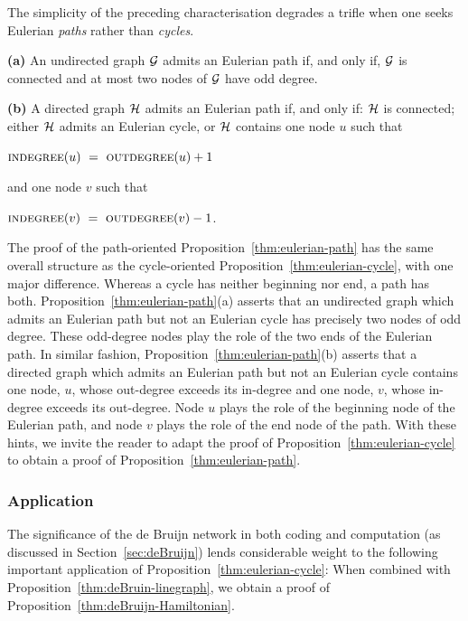 The simplicity of the preceding characterisation degrades a trifle when
one seeks Eulerian {\em paths} rather than {\em cycles}.

\begin{prop}
\label{thm:eulerian-path}
{\bf (a)}
An undirected graph $\mbox{$\cal G$}$ admits an Eulerian path if, and only if,
$\mbox{$\cal G$}$ is connected and at most two nodes of $\mbox{$\cal G$}$ have odd degree.

{\bf (b)}
A directed graph $\mbox{$\cal H$}$ admits an Eulerian path if, and only if: $\mbox{$\cal H$}$ is
connected; either $\mbox{$\cal H$}$ admits an Eulerian cycle, or $\mbox{$\cal H$}$ contains one
node $u$ such that

\hspace*{.5in}$\mbox{\sc indegree}(u) \ = \ \mbox{\sc outdegree}(u) +1$

\noindent
and one node $v$ such that

\hspace*{.5in}$\mbox{\sc indegree}(v) \ = \ \mbox{\sc outdegree}(v) -1$.
\end{prop}

The proof of the path-oriented Proposition~\ref{thm:eulerian-path} has
the same overall structure as the cycle-oriented
Proposition~\ref{thm:eulerian-cycle}, with one major difference.
Whereas a cycle has neither beginning nor end, a path has both.
Proposition~\ref{thm:eulerian-path}(a) asserts that an undirected
graph which admits an Eulerian path but not an Eulerian cycle has
precisely two nodes of odd degree.  These odd-degree nodes play the
role of the two ends of the Eulerian path.  In similar fashion,
Proposition~\ref{thm:eulerian-path}(b) asserts that a directed graph
which admits an Eulerian path but not an Eulerian cycle contains one
node, $u$, whose out-degree exceeds its in-degree and one node, $v$,
whose in-degree exceeds its out-degree.  Node $u$ plays the role of
the beginning node of the Eulerian path, and node $v$ plays the role
of the end node of the path.  With these hints, we invite the reader
to adapt the proof of Proposition~\ref{thm:eulerian-cycle} to obtain a
proof of Proposition~\ref{thm:eulerian-path}.

\subsubsection*{Application }

\medskip

The significance of the de Bruijn network in both coding and
computation (as discussed in Section~\ref{sec:deBruijn}) lends
considerable weight to the following important application of
Proposition~\ref{thm:eulerian-cycle}:  When combined with
Proposition~\ref{thm:deBruin-linegraph}, we obtain a proof of 
Proposition~\ref{thm:deBruijn-Hamiltonian}.

